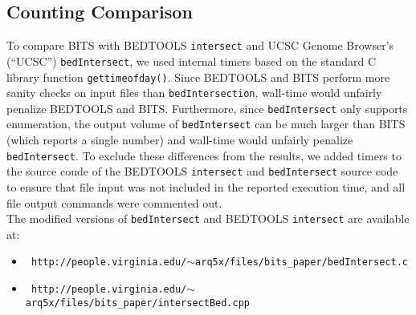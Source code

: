 \subsection{Counting Comparison}
To compare BITS with BEDTOOLS {\tt intersect} and UCSC Genome Browser’s
(``UCSC'') {\tt bedIntersect}, we used internal timers based on the standard C
library function {\tt gettimeofday()}.  Since BEDTOOLS and BITS perform more
sanity checks on input files than {\tt bedIntersection}, wall-time would
unfairly penalize BEDTOOLS and BITS.  Furthermore, since {\tt bedIntersect} only
supports enumeration, the output volume of {\tt bedIntersect} can be much larger
than BITS (which reports a single number) and wall-time would unfairly penalize
{\tt bedIntersect}.  To exclude these differences from the results, we added
timers to the source coude of the BEDTOOLS {\tt intersect} and 
{\tt bedIntersect} source code to ensure that file input was not included in the
reported execution time, and all file output commands were commented out.\\

The modified versions of {\tt bedIntersect} and BEDTOOLS {\tt intersect} are
available at:
\begin{itemize}
	\item {\tt 
	http://people.virginia.edu/$\sim$arq5x/files/bits\_paper/bedIntersect.c}
	\item {\tt 
	http://people.virginia.edu/$\sim$arq5x/files/bits\_paper/intersectBed.cpp}
\end{itemize}
